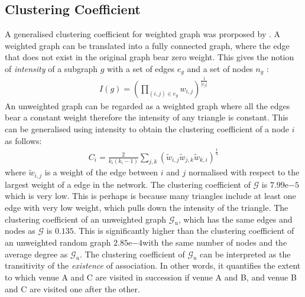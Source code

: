 \subsection{Clustering Coefficient}
A generalised clustering coefficient for weighted graph was prorposed by \cite{saramaki2007generalizations}. A weighted graph can be translated into a fully connected graph, where the edge that does not exist in the original graph bear zero weight. This gives the notion of \emph{intensity} of a subgraph $g$ with a set of edges $e_{g}$ and a set of nodes $n_{g}$ \citep{saramaki2007generalizations}:
\begin{align*}
I(g) = \left( \prod_{(i, j)\in e_{g}}^{}w_{i, j} \right)^{\frac{1}{|e_{g}|}}
\end{align*}
An unweighted graph can be regarded as a weighted graph where all the edges bear a constant weight therefore the intensity of any triangle is constant. This can be generalised using intensity to obtain the clustering coefficient of a node $i$ as follows\citep{saramaki2007generalizations}:
\begin{align*}
C_i = \frac{2}{k_i(k_i-1)}\sum_{j, k}^{}(\widetilde{w}_{i, j}\widetilde{w}_{j, k}\widetilde{w}_{k, i})^{\frac{1}{3}}
\end{align*}
where $\widetilde{w}_{i, j}$ is a weight of the edge between $i$ and $j$ normalised with respect to the largest weight of a edge in the network. 
The clustering coefficient of $\mathcal{G}$ is $7.99\mathrm{e}{-5}$ which is very low. This is perhaps is because many triangles include at least one edge with very low weight, which pulls down the intensity of the triangle.
The clustering coefficient of an unweighted graph $\mathcal{G}_u$, which has the same edges and nodes as $\mathcal{G}$ is $0.135$. This is significantly higher than the clustering coefficient of an unweighted random graph $2.85\mathrm{e}{-4}$with the same number of nodes and the average degree as $\mathcal{G}_u$. The clustering coefficient of  $\mathcal{G}_u$ can be interpreted as the transitivity of the \emph{existence} of association. In other words, it quantifies the extent to which venue A and C are visited in succession if venue A and B, and venue B and C are visited one after the other.